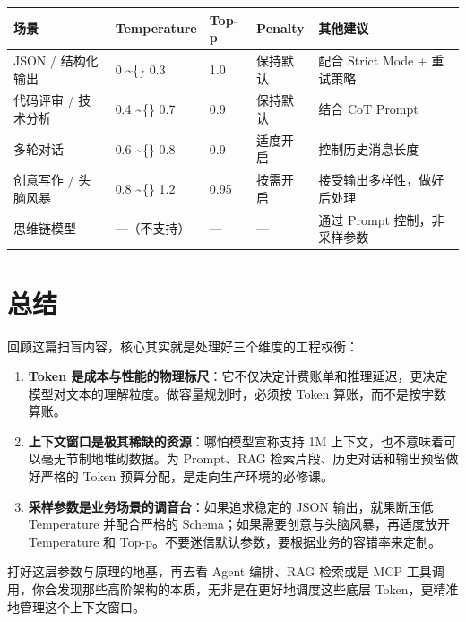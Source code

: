 \documentclass[10pt,a4paper]{ctexart}
\begin{document}
{\footnotesize
\begin{tabularx}{\textwidth}{|X|X|X|X|X|}
\hline
\textbf{场景} & \textbf{Temperature} & \textbf{Top-p} & \textbf{Penalty} & \textbf{其他建议} \\
\hline
JSON / 结构化输出 & 0 \textasciitilde\{\} 0.3 & 1.0 & 保持默认 & 配合 Strict Mode + 重试策略 \\
\hline
代码评审 / 技术分析 & 0.4 \textasciitilde\{\} 0.7 & 0.9 & 保持默认 & 结合 CoT Prompt \\
\hline
多轮对话 & 0.6 \textasciitilde\{\} 0.8 & 0.9 & 适度开启 & 控制历史消息长度 \\
\hline
创意写作 / 头脑风暴 & 0.8 \textasciitilde\{\} 1.2 & 0.95 & 按需开启 & 接受输出多样性，做好后处理 \\
\hline
思维链模型 & —（不支持） & — & — & 通过 Prompt 控制，非采样参数 \\
\hline
\end{tabularx}
}



\section{总结}


回顾这篇扫盲内容，核心其实就是处理好三个维度的工程权衡：


\begin{enumerate}[itemsep=2pt, topsep=4pt]
  \item \textbf{Token 是成本与性能的物理标尺}：它不仅决定计费账单和推理延迟，更决定模型对文本的理解粒度。做容量规划时，必须按 Token 算账，而不是按字数算账。
  \item \textbf{上下文窗口是极其稀缺的资源}：哪怕模型宣称支持 1M 上下文，也不意味着可以毫无节制地堆砌数据。为 Prompt、RAG 检索片段、历史对话和输出预留做好严格的 Token 预算分配，是走向生产环境的必修课。
  \item \textbf{采样参数是业务场景的调音台}：如果追求稳定的 JSON 输出，就果断压低 Temperature 并配合严格的 Schema；如果需要创意与头脑风暴，再适度放开 Temperature 和 Top-p。不要迷信默认参数，要根据业务的容错率来定制。
\end{enumerate}


打好这层参数与原理的地基，再去看 Agent 编排、RAG 检索或是 MCP 工具调用，你会发现那些高阶架构的本质，无非是在更好地调度这些底层 Token，更精准地管理这个上下文窗口。
\end{document}
